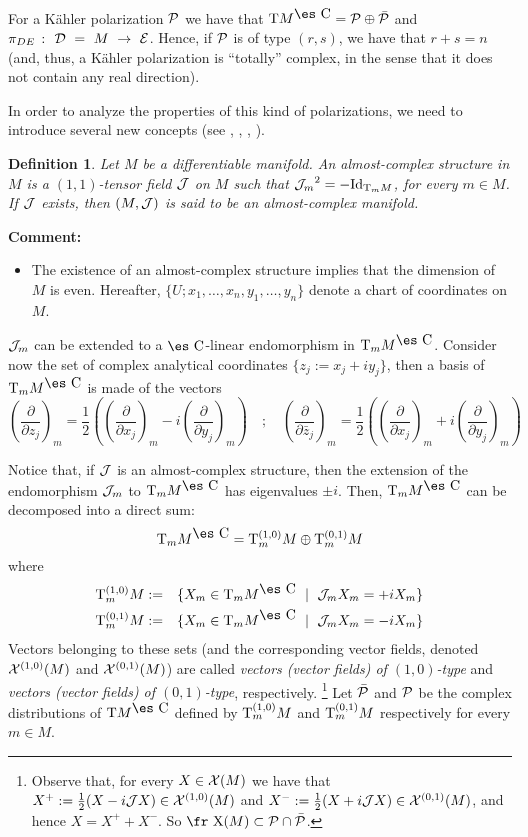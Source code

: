 \documentclass[12pt]{article}
\newtheorem{definition}{Definition}
\def\beann{\begin{eqnarray*}}
\def\eeann{\end{eqnarray*}}
\def\derpar#1#2{\frac{\partial{#1}}{\partial{#2}}}
\def\vf{\mbox{\fr X}}
\def\P{{\cal P}}
\def\D{{\cal D}}
\def\E{{\cal E}}
\def\Complex{\mbox{\es C}}
\def\Tan{{\rm T}}
\begin{document}
For a K\"ahler polarization $\P$ we have that
$\Tan M^{\Complex} = \P \oplus \bar \P$
and $\pi_{DE}~\colon~\D~=~M~\to~\E$.
Hence, if $\P$ is of type $(r,s)$,
we have that $r+s=n$
(and, thus, a K\"ahler polarization is ``totally'' complex,
in the sense that it does not contain any real direction).

In order to analyze the properties of this kind of polarizations,
we need to introduce several new concepts
(see \cite{GS-77}, \cite{Ib-90}, \cite{Ok-87}, \cite{Wo-80}).

\begin{definition}
Let $M$ be a differentiable manifold.
An {\rm almost-complex structure} in $M$ is a $(1,1)$-tensor field
${\cal J}$ on $M$
such that ${{\cal J}_m}^2=-{\rm Id}_{\Tan_m M}$, for every $m \in M$.
If ${\cal J}$ exists, then $(M,{\cal J})$ is said to be an
{\rm almost-complex manifold}.
\end{definition}

{\bf Comment:}
\begin{itemize}
\item
The existence of an almost-complex structure
implies that the dimension of $M$ is even.
Hereafter, $\{ U; x_1,\ldots ,x_n,y_1,\ldots ,y_n\}$
denote a chart of coordinates on $M$.
\end{itemize}

${\cal J}_m$ can be extended to a $\Complex$-linear endomorphism
in $\Tan_m M^{\Complex}$.
Consider now the set of complex analytical coordinates
$\{ z_j := x_j+iy_j \}$,
then a basis of $\Tan_m M^{\Complex}$ is made of the vectors
$$
\left(\derpar{}{z_j}\right)_m = \frac{1}{2} \left(
\left(\derpar{}{x_j}\right)_m -i\left(\derpar{}{y_j}\right)_m \right)
\quad ; \quad
\left(\derpar{}{\bar z_j}\right)_m = \frac{1}{2} \left(
\left(\derpar{}{x_j}\right)_m +i\left(\derpar{}{y_j}\right)_m \right)
$$

Notice that, if ${\cal J}$ is an almost-complex structure, then
the extension of the endomorphism ${\cal J}_m$ to
$\Tan_mM^{\Complex}$ has eigenvalues $\pm i$. Then, $\Tan_m
M^{\Complex}$ can be decomposed into a direct sum: $$ \Tan_m
M^{\Complex} = \Tan_m^{(1,0)} M \oplus \Tan_m^{(0,1)} M $$ where
\beann \Tan_m^{(1,0)}M&:=&\{X_m \in \Tan_m M^{\Complex}\ \mid \
{\cal J}_m X_m=+iX_m\}
\\
\Tan_m^{(0,1)}M&:=&\{X_m \in \Tan_m M^{\Complex}\ \mid \ {\cal J}_m
X_m=-iX_m\}
\eeann
Vectors belonging to these sets
(and the corresponding vector fields,
denoted ${\cal X}^{(1,0)}(M)$ and
${\cal X}^{(0,1)}(M)$) are called
{\it vectors (vector fields) of $(1,0)$-type}
and
{\it vectors (vector fields) of $(0,1)$-type},
respectively.%
\footnote{
Observe that, for every $X \in {\cal X}(M)$
we have that
$X^+ := \frac{1}{2}(X-i{\cal J}X) \in {\cal X}^{(1,0)}(M)$
and
$X^- := \frac{1}{2}(X+i{\cal J}X) \in {\cal X}^{(0,1)}(M)$,
and hence $X = X^+ + X^-$. So $\vf (M)\subset \P \cap \bar\P$.}
Let $\bar \P$ and $\P$ be the complex distributions of
$\Tan M^{\Complex}$ defined by
$\Tan_m^{(1,0)}M$ and $\Tan_m^{(0,1)}M$
respectively for every $m \in M$.
\end{document}
